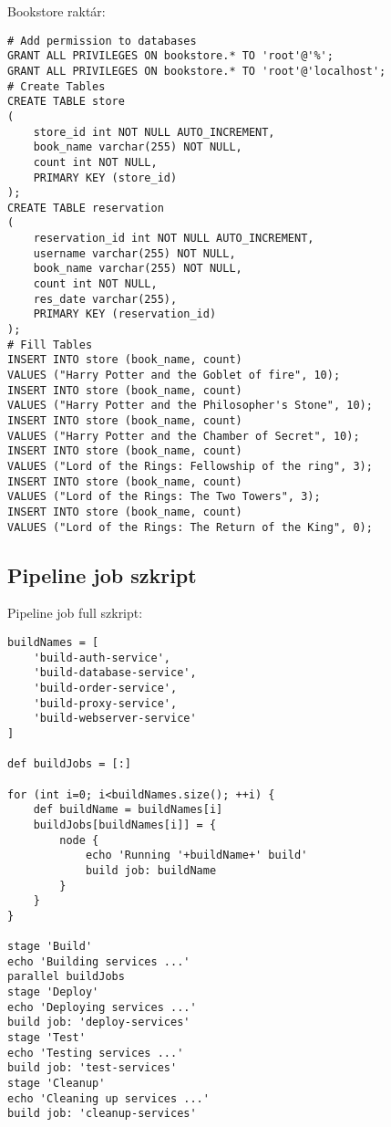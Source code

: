 Bookstore raktár:

\begin{verbatim}
# Add permission to databases
GRANT ALL PRIVILEGES ON bookstore.* TO 'root'@'%';
GRANT ALL PRIVILEGES ON bookstore.* TO 'root'@'localhost';
# Create Tables
CREATE TABLE store
(
    store_id int NOT NULL AUTO_INCREMENT,
    book_name varchar(255) NOT NULL,
    count int NOT NULL,
    PRIMARY KEY (store_id)
);
CREATE TABLE reservation
(
    reservation_id int NOT NULL AUTO_INCREMENT,
    username varchar(255) NOT NULL,
    book_name varchar(255) NOT NULL,
    count int NOT NULL,
    res_date varchar(255),
    PRIMARY KEY (reservation_id)
);
# Fill Tables
INSERT INTO store (book_name, count)
VALUES ("Harry Potter and the Goblet of fire", 10);
INSERT INTO store (book_name, count)
VALUES ("Harry Potter and the Philosopher's Stone", 10);
INSERT INTO store (book_name, count)
VALUES ("Harry Potter and the Chamber of Secret", 10);
INSERT INTO store (book_name, count)
VALUES ("Lord of the Rings: Fellowship of the ring", 3);
INSERT INTO store (book_name, count)
VALUES ("Lord of the Rings: The Two Towers", 3);
INSERT INTO store (book_name, count)
VALUES ("Lord of the Rings: The Return of the King", 0);
\end{verbatim}

\subsection{\texorpdfstring{Pipeline job
szkript\label{appendix-pipline}}{Pipeline job szkript}}\label{pipeline-job-szkript}

Pipeline job full szkript:

\begin{verbatim}
buildNames = [
    'build-auth-service',
    'build-database-service',
    'build-order-service',
    'build-proxy-service',
    'build-webserver-service'
]

def buildJobs = [:]

for (int i=0; i<buildNames.size(); ++i) {
    def buildName = buildNames[i]
    buildJobs[buildNames[i]] = {
        node {
            echo 'Running '+buildName+' build'
            build job: buildName
        }
    }
}

stage 'Build'
echo 'Building services ...'
parallel buildJobs
stage 'Deploy'
echo 'Deploying services ...'
build job: 'deploy-services'
stage 'Test'
echo 'Testing services ...'
build job: 'test-services'
stage 'Cleanup'
echo 'Cleaning up services ...'
build job: 'cleanup-services'
\end{verbatim}

